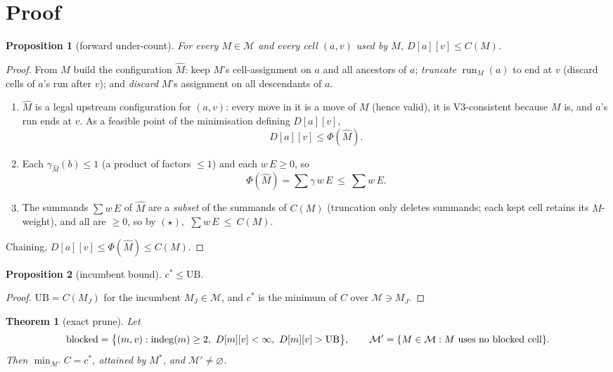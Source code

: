 \documentclass[11pt]{article}
\newtheorem{proposition}{Proposition}
\newtheorem{theorem}{Theorem}
\DeclareMathOperator{\indeg}{indeg}
\DeclareMathOperator{\rn}{run}
\newcommand{\Mh}{\widehat{M}}
\newcommand{\Mcal}{\mathcal{M}}
\newcommand{\cst}{c^{\ast}}
\newcommand{\Mst}{M^{\ast}}
\begin{document}
\section*{Proof}

\begin{proposition}[forward under-count]\label{prop:lb}
For every $M\in\Mcal$ and every cell $(a,v)$ used by $M$, \quad $D[a][v]\le C(M)$.
\end{proposition}

\begin{proof}
From $M$ build the configuration $\Mh$: keep $M$'s cell-assignment on $a$ and all ancestors of $a$;
\emph{truncate} $\rn_M(a)$ to end at $v$ (discard cells of $a$'s run after $v$); and \emph{discard}
$M$'s assignment on all descendants of $a$.
\begin{enumerate}[label=(\roman*),nosep]
  \item $\Mh$ is a legal upstream configuration for $(a,v)$: every move in it is a move of $M$ (hence
        valid), it is V3-consistent because $M$ is, and $a$'s run ends at $v$. As a feasible point of
        the minimisation defining $D[a][v]$,
        \[
          D[a][v]\le\Phi(\Mh).
        \]
  \item Each $\gamma_{\Mh}(b)\le 1$ (a product of factors $\le 1$) and each $w\,E\ge 0$, so
        \[
          \Phi(\Mh)=\sum \gamma\,w\,E\ \le\ \sum w\,E.
        \]
  \item The summands $\sum w\,E$ of $\Mh$ are a \emph{subset} of the summands of $C(M)$ (truncation
        only deletes summands; each kept cell retains its $M$-weight), and all are $\ge 0$, so by
        $(\star)$, $\ \sum w\,E\ \le\ C(M)$.
\end{enumerate}
Chaining, $D[a][v]\le\Phi(\Mh)\le C(M)$. \qedhere
\end{proof}

\begin{proposition}[incumbent bound]\label{prop:ub}
$\cst\le\mathrm{UB}$.
\end{proposition}

\begin{proof}
$\mathrm{UB}=C(M_J)$ for the incumbent $M_J\in\Mcal$, and $\cst$ is the minimum of $C$ over
$\Mcal\ni M_J$. \qedhere
\end{proof}

\begin{theorem}[exact prune]\label{thm:exact}
Let
\[
  \text{\normalfont blocked}=\bigl\{(m,v): \indeg(m)\ge 2,\ D[m][v]<\infty,\ D[m][v]>\mathrm{UB}\bigr\},
  \qquad
  \Mcal'=\{M\in\Mcal: M\text{ uses no blocked cell}\}.
\]
Then $\min_{\Mcal'}C=\cst$, attained by $\Mst$, and $\Mcal'\ne\varnothing$.
\end{theorem}
\end{document}
